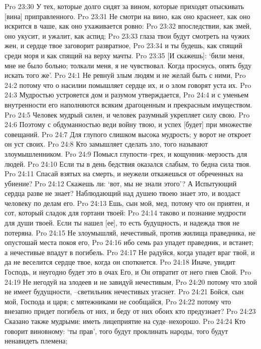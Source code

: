 Pro 23:30  У тех, которые долго сидят за вином, которые приходят отыскивать [вина] приправленного.
Pro 23:31  Не смотри на вино, как оно краснеет, как оно искрится в чаше, как оно ухаживается ровно:
Pro 23:32  впоследствии, как змей, оно укусит, и ужалит, как аспид;
Pro 23:33  глаза твои будут смотреть на чужих жен, и сердце твое заговорит развратное,
Pro 23:34  и ты будешь, как спящий среди моря и как спящий на верху мачты.
Pro 23:35  [И скажешь]: `били меня, мне не было больно; толкали меня, я не чувствовал. Когда проснусь, опять буду искать того же'.
Pro 24:1  Не ревнуй злым людям и не желай быть с ними,
Pro 24:2  потому что о насилии помышляет сердце их, и о злом говорят уста их.
Pro 24:3  Мудростью устрояется дом и разумом утверждается,
Pro 24:4  и с уменьем внутренности его наполняются всяким драгоценным и прекрасным имуществом.
Pro 24:5  Человек мудрый силен, и человек разумный укрепляет силу свою.
Pro 24:6  Поэтому с обдуманностью веди войну твою, и успех [будет] при множестве совещаний.
Pro 24:7  Для глупого слишком высока мудрость; у ворот не откроет он уст своих.
Pro 24:8  Кто замышляет сделать зло, того называют злоумышленником.
Pro 24:9  Помысл глупости--грех, и кощунник--мерзость для людей.
Pro 24:10  Если ты в день бедствия оказался слабым, то бедна сила твоя.
Pro 24:11  Спасай взятых на смерть, и неужели откажешься от обреченных на убиение?
Pro 24:12  Скажешь ли: `вот, мы не знали этого'? А Испытующий сердца разве не знает? Наблюдающий над душею твоею знает это, и воздаст человеку по делам его.
Pro 24:13  Ешь, сын мой, мед, потому что он приятен, и сот, который сладок для гортани твоей:
Pro 24:14  таково и познание мудрости для души твоей. Если ты нашел [ее], то есть будущность, и надежда твоя не потеряна.
Pro 24:15  Не злоумышляй, нечестивый, против жилища праведника, не опустошай места покоя его,
Pro 24:16  ибо семь раз упадет праведник, и встанет; а нечестивые впадут в погибель.
Pro 24:17  Не радуйся, когда упадет враг твой, и да не веселится сердце твое, когда он споткнется.
Pro 24:18  Иначе, увидит Господь, и неугодно будет это в очах Его, и Он отвратит от него гнев Свой.
Pro 24:19  Не негодуй на злодеев и не завидуй нечестивым,
Pro 24:20  потому что злой не имеет будущности, --светильник нечестивых угаснет.
Pro 24:21  Бойся, сын мой, Господа и царя; с мятежниками не сообщайся,
Pro 24:22  потому что внезапно придет погибель от них, и беду от них обоих кто предузнает?
Pro 24:23  Сказано также мудрыми: иметь лицеприятие на суде--нехорошо.
Pro 24:24  Кто говорит виновному: `ты прав', того будут проклинать народы, того будут ненавидеть племена;
